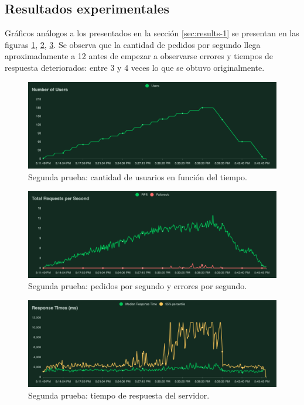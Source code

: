 \documentclass[11pt]{scrartcl}
\begin{document}
\subsection{Resultados experimentales}

Gráficos análogos a los presentados en la sección \ref{sec:results-1} se presentan en las figuras \ref{fig:test-2-users}, \ref{fig:test-2-requests-per-second}, \ref{fig:test-2-response-times}. Se observa que la cantidad de pedidos por segundo llega aproximadamente a 12 antes de empezar a observarse errores y tiempos de respuesta deteriorados: entre 3 y 4 veces lo que se obtuvo originalmente.

\begin{figure}
\centering
\includegraphics[scale=0.44]{img3/usercount}
\caption{Segunda prueba: cantidad de usuarios en función del tiempo.}
\label{fig:test-2-users}
\end{figure}

\begin{figure}
\centering
\includegraphics[scale=0.44]{img3/requests-per-second}
\caption{Segunda prueba: pedidos por segundo y errores por segundo.}
\label{fig:test-2-requests-per-second}
\end{figure}

\begin{figure}
\centering
\includegraphics[scale=0.44]{img3/response-times}
\caption{Segunda prueba: tiempo de respuesta del servidor.}
\label{fig:test-2-response-times}
\end{figure}
\end{document}
